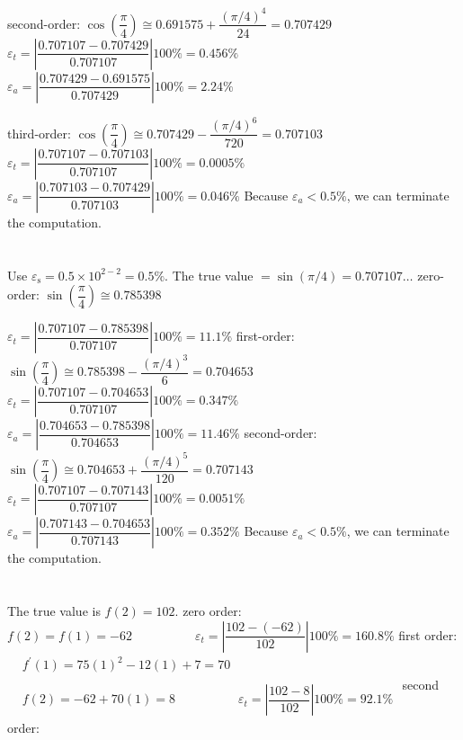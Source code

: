 \documentclass[../main.tex]{subfiles}
\begin{document}
\begin{enumerate}[label=\bfseries(\alph*)]
second-order:
\bigbreak
$\cos \left(\dfrac{\pi}{4}\right) \cong 0.691575+\dfrac{(\pi / 4)^{4}}{24}=0.707429$
\bigbreak
$\varepsilon_{t}=\left|\dfrac{0.707107-0.707429}{0.707107}\right| 100 \%=0.456 \%$
\bigbreak
$\varepsilon_{a}=\left|\dfrac{0.707429-0.691575}{0.707429}\right| 100 \%=2.24 \%$
\bigbreak

third-order:
\bigbreak
$\cos \left(\dfrac{\pi}{4}\right) \cong 0.707429-\dfrac{(\pi / 4)^{6}}{720}=0.707103$
\bigbreak
$\varepsilon_{t}=\left|\dfrac{0.707107-0.707103}{0.707107}\right| 100 \%=0.0005 \%$
\bigbreak
$\varepsilon_{a}=\left|\dfrac{0.707103-0.707429}{0.707103}\right| 100 \%=0.046 \%$
\bigbreak
Because $\varepsilon_{a}<0.5 \%$, we can terminate the computation.
\bigbreak


\section{}
Use $\varepsilon_{\mathrm{s}}=0.5 \times 10^{2-2}=0.5 \%$. The true value $=\sin (\pi / 4)=0.707107 \ldots$
\bigbreak
zero-order: 
\bigbreak
$\sin \left(\dfrac{\pi}{4}\right) \cong 0.785398$
\bigbreak

$\varepsilon_{t}=\left|\dfrac{0.707107-0.785398}{0.707107}\right| 100 \%=11.1 \%$
\bigbreak
first-order:
\bigbreak
$\sin \left(\dfrac{\pi}{4}\right) \cong 0.785398-\dfrac{(\pi / 4)^{3}}{6}=0.704653$
\bigbreak
$\varepsilon_{t}=\left|\dfrac{0.707107-0.704653}{0.707107}\right| 100 \%=0.347 \%$
\bigbreak
$\varepsilon_{a}=\left|\dfrac{0.704653-0.785398}{0.704653}\right| 100 \%=11.46 \%$
\bigbreak
second-order:
\bigbreak
$\sin \left(\dfrac{\pi}{4}\right) \cong 0.704653+\dfrac{(\pi / 4)^{5}}{120}=0.707143$
\bigbreak
$\varepsilon_{t}=\left|\dfrac{0.707107-0.707143}{0.707107}\right| 100 \%=0.0051 \%$
\bigbreak
$\varepsilon_{a}=\left|\dfrac{0.707143-0.704653}{0.707143}\right| 100 \%=0.352 \%$
\bigbreak
Because $\varepsilon_{a}<0.5 \%$, we can terminate the computation.
\bigbreak


\section{}

The true value is $f(2)=102$.
\bigbreak
zero order:
\bigbreak
$f(2)=f(1)=-62 \quad\quad\quad\quad\quad\varepsilon_{t}=\left|\dfrac{102-(-62)}  {102}\right| 100 \%=160.8 \%$
\bigbreak
first order:
\bigbreak
$
\begin{aligned}
& f^{\prime}(1)=75(1)^{2}-12(1)+7=70 \\ \\
& f(2)=-62+70(1)=8 \quad\quad\quad\quad\quad \varepsilon_{t}=\left|\dfrac{102-8}{102}\right| 100 \%=92.1 \% 
\end{aligned}
$
\bigbreak
second order:
\bigbreak


\end{enumerate}
\end{document}
